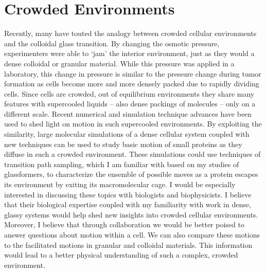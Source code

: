 \documentclass[11pt]{article}
\begin{document}
\section{Crowded Environments}
Recently, many have touted the analogy between crowded cellular environments and the colloidal glass transition.  By changing the osmotic pressure, experimenters were able to `jam' the interior environment, just as they would a dense colloidal or granular material.  While this pressure was applied in a laboratory, this change in pressure is similar to the pressure change during tumor formation as cells become more and more densely packed due to rapidly dividing cells.  Since cells are crowded, out of equilibrium environments they share many features with supercooled liquids -- also dense packings of molecules -- only on a different scale.  Recent numerical and simulation technique advances have been used to shed light on motion in such supercooled environments.  By exploiting the similarity, large molecular simulations of a dense cellular system coupled with new techniques can be used to study basic motion of small proteins as they diffuse in such a crowded environment.  These simulations could use techniques of transition path sampling, which I am familiar with based on my studies of glassformers, to characterize the ensemble of possible moves as a protein escapes its environment by exiting its macromolecular cage.  I would be especially interested in discussing these topics with biologists and biophysicists.  I believe that their biological expertise coupled with my familiarity with work in dense, glassy systems would help shed new insights into crowded cellular environments.  Moreover, I believe that through collaboration we would be better poised to answer questions about motion within a cell.  We can also compare these motions to the facilitated motions in granular and colloidal materials.  This information would lead to a better physical understanding of such a complex, crowded environment.   
\end{document}
